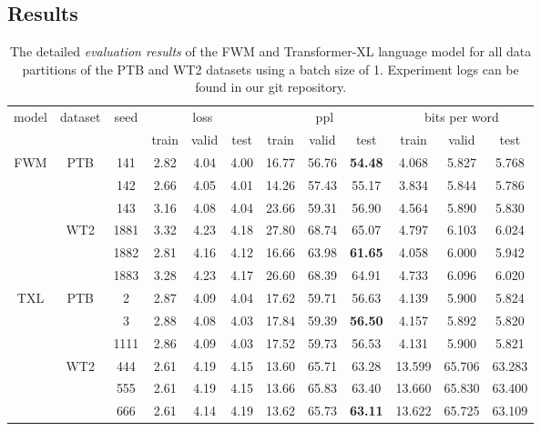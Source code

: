 \documentclass{article} \usepackage{iclr2021_conference,times}
\begin{document}
\subsection{Results}
\label{appendix:sec:lmResults}
\begin{table}[H]
  \caption{The detailed \textit{evaluation results} of the FWM and Transformer-XL language model for all data partitions of the PTB and WT2 datasets using a batch size of 1. Experiment logs can be found in our git repository.}
  \vspace{6pt}
  \centering
  \setlength{\tabcolsep}{0.15cm}
  \begin{tabular}{c|cc|ccc|ccc|ccc}
    \toprule
    \multirow{2}{*}{model} & \multirow{2}{*}{dataset} & \multirow{2}{*}{seed} & \multicolumn{3}{c}{loss} & \multicolumn{3}{c}{ppl} & \multicolumn{3}{c}{bits per word} \\
                        & & & train & valid & test & train & valid & test & train & valid & test \\
    \midrule
    \multirow{6}{*}{FWM} & 
      \multirow{3}{*}{PTB} & 141 & 2.82 & 4.04 & 4.00 & 16.77 & 56.76 & \textbf{54.48} & 4.068 & 5.827 & 5.768 \\
      &  & 142 & 2.66 & 4.05 & 4.01 & 14.26 & 57.43 & 55.17 & 3.834 & 5.844 & 5.786 \\
      &  & 143 & 3.16 & 4.08 & 4.04 & 23.66 & 59.31 & 56.90 & 4.564 & 5.890 & 5.830 \\
      \rule{0pt}{1.3\normalbaselineskip} & \multirow{3}{*}{WT2} 
        & 1881 & 3.32 & 4.23 & 4.18 & 27.80 & 68.74 & 65.07 & 4.797 & 6.103 & 6.024 \\
      & & 1882 & 2.81 & 4.16 & 4.12 & 16.66 & 63.98 & \textbf{61.65} & 4.058 & 6.000 & 5.942 \\
      & & 1883 & 3.28 & 4.23 & 4.17 & 26.60 & 68.39 & 64.91 & 4.733 & 6.096 & 6.020 \\
      \midrule
      \multirow{6}{*}{TXL} & \multirow{3}{*}{PTB} 
         & 2 & 2.87 & 4.09 & 4.04 & 17.62 & 59.71 & 56.63 & 4.139 & 5.900 & 5.824 \\
      &  & 3    & 2.88 & 4.08 & 4.03 & 17.84 & 59.39 & \textbf{56.50} & 4.157 & 5.892 & 5.820\\
      &  & 1111 & 2.86 & 4.09 & 4.03 & 17.52 & 59.73 & 56.53 & 4.131 & 5.900 & 5.821 \\
        \rule{0pt}{1.3\normalbaselineskip} & \multirow{3}{*}{WT2} 
        & 444 & 2.61 & 4.19 & 4.15 & 13.60 & 65.71 & 63.28 & 13.599 & 65.706 & 63.283 \\
      & & 555 & 2.61 & 4.19 & 4.15 & 13.66 & 65.83 & 63.40 & 13.660 & 65.830 & 63.400 \\
      & & 666 & 2.61 & 4.14 & 4.19 & 13.62 & 65.73 & \textbf{63.11} & 13.622 & 65.725 & 63.109 \\
     \bottomrule
  \end{tabular}
\label{appendix:tbl:lmresults}
\end{table}
\end{document}
